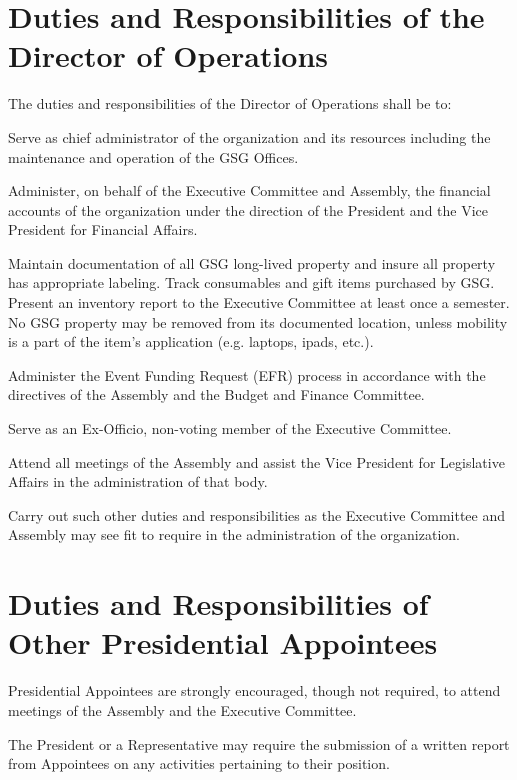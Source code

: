 \section{Duties and Responsibilities of the Director of Operations}
The duties and responsibilities of the Director of Operations shall be to:
\begin{bylaws-number}
  \item Serve as chief administrator of the organization and its resources including the maintenance and operation of the GSG Offices.
  \item Administer, on behalf of the Executive Committee and Assembly, the financial accounts of the organization under the direction of the President and the Vice President for Financial Affairs.
  \item Maintain documentation of all GSG long-lived property and insure all property has appropriate labeling. Track consumables and gift items purchased by GSG. Present an inventory report to the Executive Committee at least once a semester. No GSG property may be removed from its documented location, unless mobility is a part of the item’s application (e.g. laptops, ipads, etc.).
  \item Administer the Event Funding Request (EFR) process in accordance with the directives of the Assembly and the Budget and Finance Committee.
  \item Serve as an Ex-Officio, non-voting member of the Executive Committee.
  \item Attend all meetings of the Assembly and assist the Vice President for Legislative Affairs in the administration of that body.
  \item Carry out such other duties and responsibilities as the Executive Committee and Assembly may see fit to require in the administration of the organization.
\end{bylaws-number}

\section{Duties and Responsibilities of Other Presidential Appointees}
\begin{bylaws-number}
  \item Presidential Appointees are strongly encouraged, though not required, to attend meetings of the Assembly and the Executive Committee.
  \item The President or a Representative may require the submission of a written report from Appointees on any activities pertaining to their position.
\end{bylaws-number}

